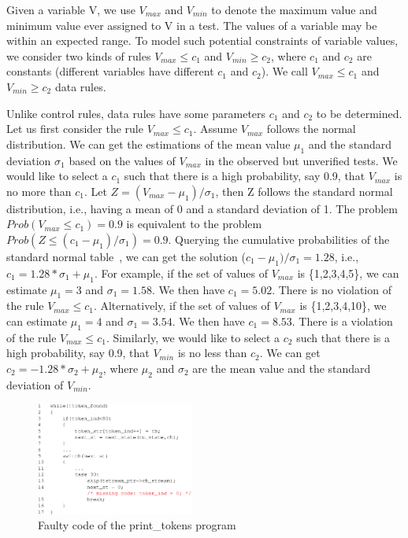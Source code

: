 \documentclass{sig-alternate}
\begin{document}
Given a variable V, we use $V_{max}$ and $V_{min}$ to denote the
maximum value and minimum value ever assigned to V in a test. The
values of a variable may be within an expected range. To model such
potential constraints of variable values, we consider two kinds of
rules $V_{max}\le c_1$ and $V_{min}\ge c_2$, where $c_1$ and $c_2$
are constants (different variables have different $c_1$ and $c_2$).
We call $V_{max}\le c_1$ and $V_{min}\ge c_2$ data rules.


Unlike control rules, data rules have some parameters $c_1$ and
$c_2$ to be determined. Let us first consider the rule $V_{max}\le
c_1$. Assume $V_{max}$ follows the normal distribution. We can get
the estimations of the mean value $\mu_1$ and the standard deviation
$\sigma_1$ based on the values of $V_{max}$ in the observed but
unverified tests. We would like to select a $c_1$ such that there is
a high probability, say 0.9, that $V_{max}$ is no more than $c_1$.
Let $Z=(V_{max}-\mu_1) / \sigma_1$, then Z follows the standard
normal distribution, i.e., having a mean of 0 and a standard
deviation of 1. The problem $Prob(V_{max}\le c_1)=0.9$ is equivalent
to the problem $Prob(Z\le (c_1-\mu_1)/\sigma_1)=0.9$.
Querying the cumulative probabilities of the standard normal
table~\cite{Normal}, we can get the solution
($c_1-\mu_1)/\sigma_1=1.28$, i.e., $c_1=1.28*\sigma_1+\mu_1$. For
example, if the set of values of $V_{max}$ is \{1,2,3,4,5\}, we can
estimate $\mu_1=3$ and $\sigma_1=1.58$. We then have $c_1=5.02$.
There is no violation of the rule $V_{max}\le c_1$. Alternatively,
if the set of values of $V_{max}$ is \{1,2,3,4,10\}, we can estimate
$\mu_1=4$ and $\sigma_1=3.54$. We then have $c_1=8.53$. There is a
violation of the rule $V_{max}\le c_1$. Similarly, we would like to
select a $c_2$ such that there is a high probability, say 0.9, that
$V_{min}$ is no less than $c_2$. We can get
$c_2=-1.28*\sigma_2+\mu_2$, where $\mu_2$ and $\sigma_2$ are the
mean value and the standard deviation of $V_{min}$.

\begin{figure}[h]
  \includegraphics[angle=0,width=0.46\textwidth]{figs/example31.eps}
  \centering
  \caption{Faulty code of the print\_tokens program}
  \label{fig:example3} %
\end{figure}
\end{document}
